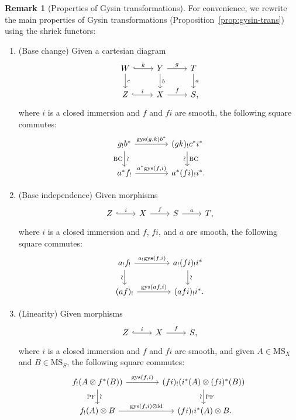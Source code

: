\documentclass{amsart}
\numberwithin{equation}{section}
\theoremstyle{plain}
\theoremstyle{definition}
\newtheorem{remark}[equation]{Remark}
\def\id{\mathrm{id}}
\def\MS{\mathrm{MS}}
\begin{document}
\begin{remark}[Properties of Gysin transformations]
	For convenience, we rewrite the main properties of Gysin transformations (Proposition~\ref{prop:gysin-trans}) using the shriek functors:
	\begin{enumerate}
		\item (Base change) Given a cartesian diagram
		\[
		\begin{tikzcd}
			W \ar[hook]{r}{k} \ar{d}{c} & Y \ar{r}{g} \ar{d}{b} & T \ar{d}{a} \\
			Z \ar[hook]{r}{i} & X \ar{r}{f} & S\rlap,
		\end{tikzcd}
		\]
		where $i$ is a closed immersion and $f$ and $fi$ are smooth, the following square commutes:
		\[
		\begin{tikzcd}[column sep=4em]
			g_!b^* \ar{r}{\mathrm{gys}(g,k)b^*} \ar{d}[sloped]{\sim}[swap]{\mathrm{BC}} & (gk)_!c^*i^* \ar{d}{\mathrm{BC}}[swap,sloped]{\sim} \\
			a^*f_! \ar{r}{a^*\mathrm{gys}(f,i)} & a^*(fi)_!i^*\rlap.
		\end{tikzcd}
		\]
		\item (Base independence) Given morphisms
		\[
		\begin{tikzcd}
			Z \ar[hook]{r}{i} & X \ar{r}{f} & S \ar{r}{a} & T\rlap,
		\end{tikzcd}
		\]
		where $i$ is a closed immersion and $f$, $fi$, and $a$ are smooth, the following square commutes:
		\[
		\begin{tikzcd}[column sep=4em]
			a_!f_! \ar{r}{a_!\mathrm{gys}(f,i)} \ar{d}[swap,sloped]{\sim} & a_!(fi)_!i^* \ar{d}[sloped]{\sim} \\
			(af)_! \ar{r}{\mathrm{gys}(af,i)} & (afi)_!i^*\rlap.
		\end{tikzcd}
		\]
		\item (Linearity) Given morphisms
		\[
		\begin{tikzcd}
			Z \ar[hook]{r}{i} & X \ar{r}{f} & S\rlap,
		\end{tikzcd}
		\]
		where $i$ is a closed immersion and $f$ and $fi$ are smooth, and given $A\in\MS_X$ and $B\in \MS_S$, the following square commutes:
		\[
		\begin{tikzcd}[column sep=4em]
			f_!(A\otimes f^*(B)) \ar{d}[sloped]{\sim}[swap]{\mathrm{PF}} \ar{r}{\mathrm{gys}(f,i)} & (fi)_!(i^*(A)\otimes (fi)^*(B)) \ar{d}{\mathrm{PF}}[swap,sloped]{\sim} \\
			f_!(A) \otimes B \ar{r}{\mathrm{gys}(f,i)\otimes\id} & (fi)_!i^*(A)\otimes B\rlap.
		\end{tikzcd}
\]
\end{enumerate}
\end{remark}
\end{document}
